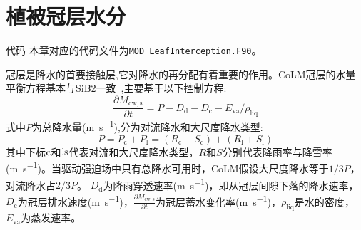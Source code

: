 
\chapter{植被冠层水分}\label{植被冠层截留}

\begin{mymdframed}{代码}
  本章对应的代码文件为\texttt{MOD\_LeafInterception.F90}。
\end{mymdframed}

冠层是降水的首要接触层,它对降水的再分配有着重要的作用。CoLM冠层的水量平衡方程基本与SiB2一致~\citep{sellers1996revised},主要基于以下控制方程:
\begin{equation}\label{eq:冠层水量控制方程}
  \frac{\partial M_{\mathrm{cw,s}}}{\partial t} = P-D_{\mathrm{d}}-D_{\mathrm{c}}-E_{\mathrm{va}} / \rho_{\mathrm{liq}}
\end{equation}
式中$P$为总降水量(\unit{m.s^{-1}}),分为对流降水和大尺度降水类型:
\begin{equation}\label{eq:降水类型}
  P=P_{\mathrm{c}}+P_{\mathrm{l}}=\left(R_{\mathrm{c}}+S_{\mathrm{c}}\right)+\left(R_{\mathrm{l}}+S_{\mathrm{l}}\right)
\end{equation}
其中下标$\rm c$和$\rm ls$代表对流和大尺度降水类型，$R$和$S$分别代表降雨率与降雪率(\unit{m.s^{-1}})。当驱动强迫场中只有总降水可用时，CoLM假设大尺度降水等于$1/3P$，对流降水占$2/3P$。
$D_{\mathrm {d}} $为降雨穿透速率(\unit{m.s^{-1}})，即从冠层间隙下落的降水速率，$D_{\mathrm {c}} $为冠层排水速度(\unit{m.s^{-1}})，$\frac{\partial M_{\mathrm{cw,s}}}{\partial t}$为冠层蓄水变化率(\unit{m.s^{-1}})，$\rho_{\mathrm {liq}} $是水的密度，$E_{\mathrm{va}}$为蒸发速率。


